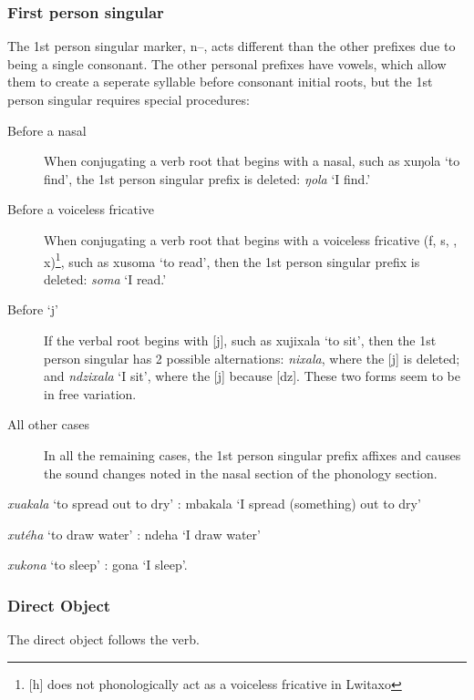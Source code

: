 \subsubsection{First person singular}
The 1st person singular marker, n--, acts different than the other prefixes due to being a single consonant.  The other personal prefixes have vowels, which allow them to create a seperate syllable before consonant initial roots, but the 1st person singular requires special procedures:

\begin{description}

\item[Before a nasal] When conjugating a verb root that begins with a nasal, such as xuŋola `to find', the 1st person singular prefix is deleted: \emph{ŋola} `I find.'

\item[Before a voiceless fricative] When conjugating a verb root that begins with a voiceless fricative (f, s, \esh{}, x)\footnote{[h] does not phonologically act as a voiceless fricative in Lwitaxo}, such as xusoma `to read', then the 1st person singular prefix is deleted: \emph{soma} `I read.'

\item[Before `j'] If the verbal root begins with [j], such as xujixala `to sit', then the 1st person singular has 2 possible alternations: \emph{nixala}, where the [j] is deleted; and \emph{ndzixala} `I sit', where the [j] because [dz].  These two forms seem to be in free variation.

\item[All other cases] In all the remaining cases, the 1st person singular prefix affixes and causes the sound changes noted in the nasal section of the phonology section. 
\end{description}
\begin{wrdex}
\item \emph{xu\beta{}akala} `to spread out to dry' : mbakala `I spread (something) out to dry'
\item \emph{xut\'eha} `to draw water' : ndeha `I draw water'
\item \emph{xukona} `to sleep' : \engma{}gona `I sleep'.
\end{wrdex}

\subsubsection{Direct Object}
The direct object follows the verb.\\

